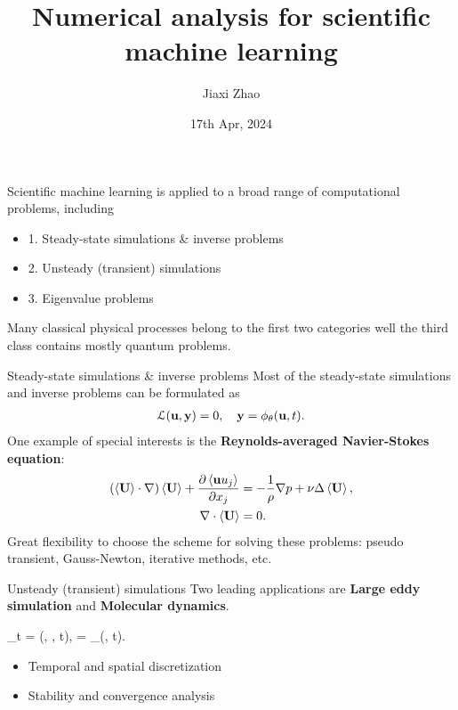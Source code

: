 \documentclass{beamer}
\title[SciML]{Numerical analysis for scientific machine learning}
\author[J. Zhao]{Jiaxi Zhao}
\date{17th Apr, 2024}
\begin{document}
\par \setlength{\parindent}{2em}

\begin{frame}
\titlepage

\end{frame}

\begin{frame}
	Scientific machine learning is applied to a broad range of computational problems, including
	\begin{itemize}
		\item 1. Steady-state simulations \& inverse problems
		\item 2. Unsteady (transient) simulations
		\item 3. Eigenvalue problems
	\end{itemize}
	Many classical physical processes belong to the first two categories well the third class contains mostly quantum problems.
\end{frame}

\begin{frame}{Steady-state simulations \& inverse problems}
	Most of the steady-state simulations and inverse problems can be formulated as 
	\begin{equation*}
		\begin{aligned}
			\mathcal{L}(\mathbf{u}, \mathbf{y}) = 0, 	\quad \mathbf{y}= \phi_{\theta}(\mathbf{u}, t).
		\end{aligned}
	\end{equation*}
	One example of special interests is the \textbf{Reynolds-averaged Navier-Stokes equation}:
	\begin{equation*}
		\begin{aligned}
	(\left\langle \mathbf{U} \right\rangle \cdot \nabla)\left\langle \mathbf{U} \right\rangle + \frac{\partial \left\langle \mathbf{u} u_j \right\rangle}{\partial x_j} &= -\frac{1}{\rho}\nabla p + \nu \Delta \left\langle \mathbf{U} \right\rangle,		\\
	\nabla \cdot \left\langle \mathbf{U} \right\rangle &= 0.
	\end{aligned}
	\end{equation*}
	Great flexibility to choose the scheme for solving these problems: pseudo transient, Gauss-Newton,
	iterative methods, etc.
\end{frame}

\begin{frame}{Unsteady (transient) simulations}
	Two leading applications are \textbf{Large eddy simulation} and \textbf{Molecular dynamics}.
	\bequn\label{non-linear}
		\begin{aligned}
			\p_t \mfu = \mcL(\mfu, \mfy, t), 	\quad \mfy = \phi_{\theta}(\mfu, t).
		\end{aligned}
	\eequn
	\begin{itemize}
		\item Temporal and spatial discretization
		\item Stability and convergence analysis
	\end{itemize}
\end{frame}
\end{document}
